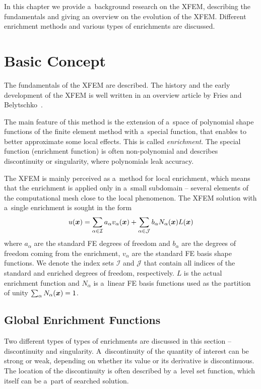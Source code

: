 
In this chapter we provide a~background research on the XFEM,
describing the fundamentals and giving an overview on the evolution of the XFEM.
Different enrichment methods and various types of enrichments are discussed.

\section{Basic Concept} \label{sec:soa_xfem}

The fundamentals of the XFEM are described. The history and the early development of the XFEM is well written
in an overview article by Fries and Belytschko~\cite{fries_xfem_overview_2010}.

The main feature of this method is the extension of a~space of polynomial shape functions of the finite element
method with a~special function, that enables to better approximate some local effects. This is called \emph{enrichment}.
The special function (enrichment function) is often non-polynomial and describes discontinuity or singularity,
where polynomials leak accuracy.

The XFEM is mainly perceived as a~method for local enrichment, which means that the enrichment is applied only
in a~small subdomain -- several elements of the computational mesh close to the local phenomenon.
The XFEM solution with a~single enrichment is sought in the form
\begin{equation} \label{eqn:soa_xfem_standard_form}
  u(\mathbf{\boldsymbol{x}}) = \sum_{\alpha\in\mathcal{I}}a_\alpha v_\alpha(\mathbf{\boldsymbol{x}})
    + \sum_{\alpha\in\mathcal{J}} b_{\alpha} N_\alpha(\mathbf{\boldsymbol{x}})L(\mathbf{\boldsymbol{x}})
\end{equation}
where $a_\alpha$ are the standard FE degrees of freedom and $b_{\alpha}$ are the degrees of freedom coming from
the enrichment, $v_\alpha$ are the standard FE basis shape functions. We denote the index sets $\mathcal{I}$ and
$\mathcal{J}$ that contain all indices of the standard and enriched degrees of freedom, respectively.
$L$ is the actual enrichment function and $N_\alpha$ is a~linear FE basis functions used as the partition of unity
$\sum_\alpha N_\alpha(\mathbf{\boldsymbol{x}}) = 1$.

\subsection{Global Enrichment Functions} \label{sec:global_enrichment}
Two different types of types of enrichments are discussed in this section -- discontinuity and singularity.
A~discontinuity of the quantity of interest can be strong or weak, depending on whether its value
or its derivative is discontinuous. The location of the discontinuity is often described by a~level set function,
which itself can be a~part of searched solution.

